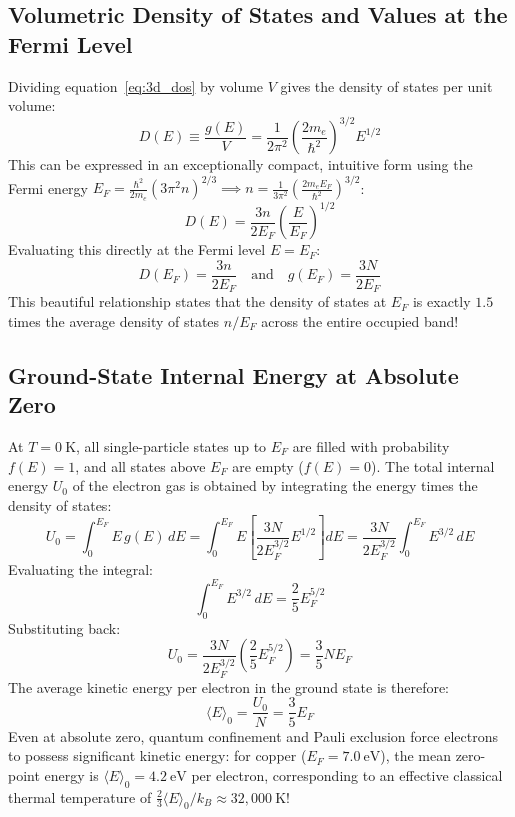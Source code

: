 \documentclass[11pt,a4paper]{article}
\begin{document}
\subsection{Volumetric Density of States and Values at the Fermi Level}
Dividing equation~\eqref{eq:3d_dos} by volume $V$ gives the density of states per unit volume:
\begin{equation}
D(E) \equiv \frac{g(E)}{V} = \frac{1}{2\pi^2}\left(\frac{2m_e}{\hbar^2}\right)^{3/2} E^{1/2}
\label{eq:volumetric_dos}
\end{equation}
This can be expressed in an exceptionally compact, intuitive form using the Fermi energy $E_F = \frac{\hbar^2}{2m_e}(3\pi^2 n)^{2/3} \implies n = \frac{1}{3\pi^2}\left(\frac{2m_e E_F}{\hbar^2}\right)^{3/2}$:
\begin{equation}
\boxed{D(E) = \frac{3n}{2E_F}\left(\frac{E}{E_F}\right)^{1/2}}
\label{eq:dos_normalized}
\end{equation}
Evaluating this directly at the Fermi level $E = E_F$:
\begin{equation}
\boxed{D(E_F) = \frac{3n}{2E_F}} \quad \text{and} \quad \boxed{g(E_F) = \frac{3N}{2E_F}}
\label{eq:dos_at_Ef}
\end{equation}
This beautiful relationship states that the density of states at $E_F$ is exactly $1.5$ times the average density of states $n/E_F$ across the entire occupied band!

\subsection{Ground-State Internal Energy at Absolute Zero}
At $T = 0\ \mathrm{K}$, all single-particle states up to $E_F$ are filled with probability $f(E) = 1$, and all states above $E_F$ are empty ($f(E) = 0$). The total internal energy $U_0$ of the electron gas is obtained by integrating the energy times the density of states:
\begin{equation}
U_0 = \int_0^{E_F} E\,g(E)\,dE = \int_0^{E_F} E \left[ \frac{3N}{2E_F^{3/2}} E^{1/2} \right] dE = \frac{3N}{2E_F^{3/2}} \int_0^{E_F} E^{3/2}\,dE
\end{equation}
Evaluating the integral:
\begin{equation}
\int_0^{E_F} E^{3/2}\,dE = \frac{2}{5}E_F^{5/2}
\end{equation}
Substituting back:
\begin{equation}
U_0 = \frac{3N}{2E_F^{3/2}} \left(\frac{2}{5}E_F^{5/2}\right) = \frac{3}{5}N E_F
\label{eq:ground_state_energy}
\end{equation}
The average kinetic energy per electron in the ground state is therefore:
\begin{equation}
\boxed{\langle E \rangle_0 = \frac{U_0}{N} = \frac{3}{5}E_F}
\label{eq:average_energy_zero_T}
\end{equation}
Even at absolute zero, quantum confinement and Pauli exclusion force electrons to possess significant kinetic energy: for copper ($E_F = 7.0\ \mathrm{eV}$), the mean zero-point energy is $\langle E \rangle_0 = 4.2\ \mathrm{eV}$ per electron, corresponding to an effective classical thermal temperature of $\frac{2}{3}\langle E \rangle_0 / k_B \approx 32{,}000\ \mathrm{K}$!
\end{document}
